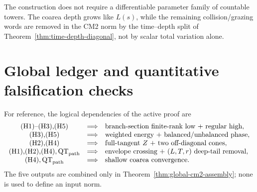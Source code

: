 \documentclass[11pt]{article}
\begin{document}
The construction does not require a differentiable parameter family of
countable towers.  The coarea depth grows like $L(s)$, while the remaining
collision/grazing words are removed in the CM2 norm by the time--depth split
of Theorem~\ref{thm:time-depth-diagonal}, not by scalar total variation alone.

\section{Global ledger and quantitative falsification checks}

For reference, the logical dependencies of the active proof are
\[
\begin{array}{ccl}
 \textup{(H1)--(H3),(H5)}&\Longrightarrow&
   \text{branch-section finite-rank low + regular high},\\
 \textup{(H3),(H5)}&\Longrightarrow&
   \text{weighted energy + balanced/unbalanced phase},\\
 \textup{(H2),(H4)}&\Longrightarrow&
   \text{full-tangent }Z\text{ + two off-diagonal cones},\\
 \textup{(H1),(H2),(H4)},\mathrm{QT}_{\rm path}&\Longrightarrow&
   \text{envelope crossing + }(L,T,r)\text{ deep-tail removal},\\
 \textup{(H4)},\mathrm{QT}_{\rm path}&\Longrightarrow&
   \text{shallow coarea convergence}.
\end{array}
\]
The five outputs are combined only in
Theorem~\ref{thm:global-cm2-assembly}; none is used to define an input norm.
\end{document}
